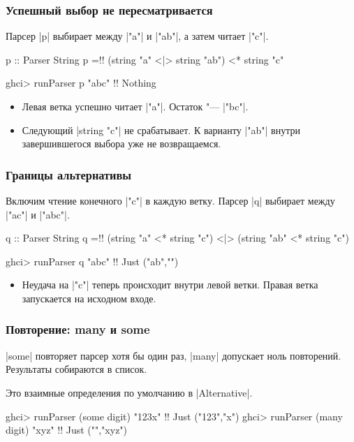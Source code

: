 \documentclass[11pt]{beamer}
\begin{document}
\begin{frame}[fragile]
  \frametitle{Успешный выбор не пересматривается}
  Парсер \haskinline|p| выбирает между \haskinline|"a"| и \haskinline|"ab"|, а затем читает \haskinline|"c"|.
  \pause
  \begin{haskellsmall}
    p :: Parser String
    p =!\pause! (string "a" <|> string "ab") <* string "c"
  \end{haskellsmall}
  \begin{haskellsmall}
    ghci> runParser p "abc" !\pause!
    Nothing
  \end{haskellsmall}
  \begin{itemize}
    \item Левая ветка успешно читает \haskinline|"a"|. Остаток "--- \haskinline|"bc"|.
    \item Следующий \haskinline|string "c"| не срабатывает. К варианту \haskinline|"ab"| внутри завершившегося выбора уже не возвращаемся.
  \end{itemize}
\end{frame}

\begin{frame}[fragile]
  \frametitle{Границы альтернативы}
  Включим чтение конечного \haskinline|"c"| в каждую ветку. Парсер \haskinline|q| выбирает между \haskinline|"ac"| и \haskinline|"abc"|.
  \pause
  \begin{haskellsmall}
    q :: Parser String
    q =!\pause! (string "a" <* string "c")
        <|> (string "ab" <* string "c")
  \end{haskellsmall}
  \begin{haskellsmall}
    ghci> runParser q "abc" !\pause!
    Just ("ab","")
  \end{haskellsmall}
  \begin{itemize}
    \item Неудача на \haskinline|"c"| теперь происходит внутри левой ветки. Правая ветка запускается на исходном входе.
  \end{itemize}
\end{frame}

\begin{frame}[fragile]
  \frametitle{Повторение: many и some}
  \haskinline|some| повторяет парсер хотя бы один раз, \haskinline|many| допускает ноль повторений. Результаты собираются в список.
  \pause
  Это взаимные определения по умолчанию в \haskinline|Alternative|.
  \begin{haskellsmall}
    ghci> runParser (some digit) "123x" !\pause!
    Just ("123","x")
    ghci> runParser (many digit) "xyz" !\pause!
    Just ("","xyz")
  \end{haskellsmall}
\end{frame}
\end{document}
